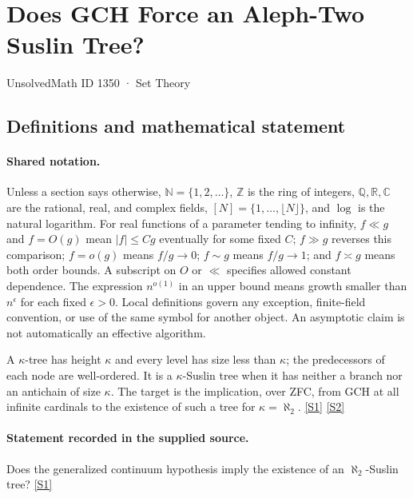 \documentclass[11pt,a4paper]{article}
\newcommand{\N}{\mathbb{N}}
\newcommand{\Z}{\mathbb{Z}}
\newcommand{\Q}{\mathbb{Q}}
\newcommand{\R}{\mathbb{R}}
\newcommand{\C}{\mathbb{C}}
\newcommand{\sref}[2]{\hyperlink{source:#1:#2}{[S#2]}}
\begin{document}

\setcounter{section}{1349}

\section{Does GCH Force an Aleph-Two Suslin Tree?}\label{1350}

{\small\sffamily UnsolvedMath ID 1350 · Set Theory}

\subsection{Definitions and mathematical statement}

\paragraph{Shared notation.}Unless a section says otherwise, $\N=\{1,2,\ldots\}$,
$\Z$ is the ring of integers, $\Q,\R,\C$ are the rational, real, and complex
fields, $[N]=\{1,\ldots,\lfloor N\rfloor\}$, and $\log$ is the natural
logarithm. For real functions of a parameter tending to infinity,
$f\ll g$ and $f=O(g)$ mean $|f|\leq Cg$ eventually for some fixed $C$;
$f\gg g$ reverses this comparison; $f=o(g)$ means $f/g\to0$;
$f\sim g$ means $f/g\to1$; and $f\asymp g$ means both order bounds.
A subscript on $O$ or $\ll$ specifies allowed constant dependence.
The expression $n^{o(1)}$ in an upper bound means growth smaller than
$n^\epsilon$ for each fixed $\epsilon>0$. Local definitions govern any
exception, finite-field convention, or use of the same symbol for another
object. An asymptotic claim is not automatically an effective algorithm.



A $\kappa$-tree has height $\kappa$ and every level has size less than $\kappa$; the predecessors of each node are well-ordered. It is a $\kappa$-Suslin tree when it has neither a branch nor an antichain of size $\kappa$. The target is the implication, over ZFC, from GCH at all infinite cardinals to the existence of such a tree for $\kappa=\aleph_2$. \sref{1350}{1} \sref{1350}{2}

\paragraph{Statement recorded in the supplied source.}
Does the generalized continuum hypothesis imply the existence of an $\aleph_2$-Suslin tree? \sref{1350}{1}
\end{document}
